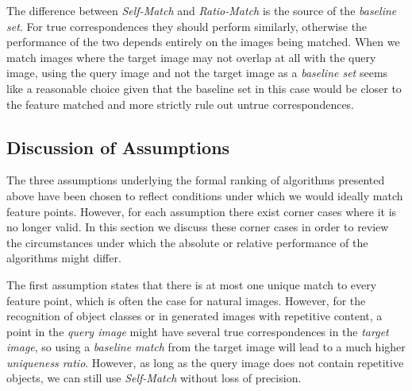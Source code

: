 \documentclass[10pt,journal,cspaper,compsoc]{IEEEtran}
\begin{document}
The difference between \emph{Self-Match} and \emph{Ratio-Match} is  
the source of the \emph{baseline set}. For true correspondences 
they should perform similarly, otherwise the 
performance of the two depends entirely on the images being matched. 
When we match images where the target image may not overlap at all 
with the query image, using the query image and not the target image as 
a \emph{baseline set} seems like a reasonable choice given that the 
baseline set in this case would be closer to the feature matched and 
more strictly rule out untrue correspondences.


\subsection{Discussion of Assumptions}
\label{ref:disc_assumptions}




The three assumptions underlying the formal ranking of 
algorithms presented above have been chosen to reflect conditions under which we would ideally match feature points. However, for each assumption there exist 
corner cases where it is no longer valid. In this section we 
discuss these corner cases in order to review the 
circumstances under which the absolute or relative performance of the 
algorithms might differ.

The first assumption states that there is at most one unique match to 
every feature point, which is often the case for natural images. 
However, for the recognition of object classes or in generated images 
with repetitive content, a point in the \emph{query image} might have 
several true correspondences in the \emph{target image}, so using a 
\emph{baseline match} from the target image will lead to a much higher 
\emph{uniqueness ratio}. However, as long as the query image does not 
contain repetitive objects, we can still use \emph{Self-Match} without 
loss of precision.
\end{document}
